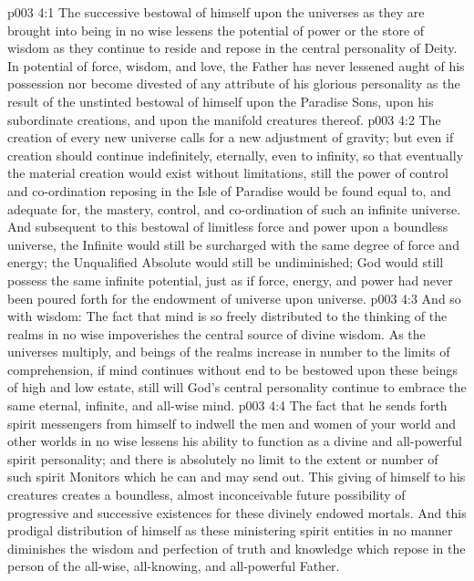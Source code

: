 \vs p003 4:1 The successive bestowal of himself upon the universes as they are brought into being in no wise lessens the potential of power or the store of wisdom as they continue to reside and repose in the central personality of Deity. In potential of force, wisdom, and love, the Father has never lessened aught of his possession nor become divested of any attribute of his glorious personality as the result of the unstinted bestowal of himself upon the Paradise Sons, upon his subordinate creations, and upon the manifold creatures thereof.
\vs p003 4:2 The creation of every new universe calls for a new adjustment of gravity; but even if creation should continue indefinitely, eternally, even to infinity, so that eventually the material creation would exist without limitations, still the power of control and co\hyp{}ordination reposing in the Isle of Paradise would be found equal to, and adequate for, the mastery, control, and co\hyp{}ordination of such an infinite universe. And subsequent to this bestowal of limitless force and power upon a boundless universe, the Infinite would still be surcharged with the same degree of force and energy; the Unqualified Absolute would still be undiminished; God would still possess the same infinite potential, just as if force, energy, and power had never been poured forth for the endowment of universe upon universe.
\vs p003 4:3 And so with wisdom: The fact that mind is so freely distributed to the thinking of the realms in no wise impoverishes the central source of divine wisdom. As the universes multiply, and beings of the realms increase in number to the limits of comprehension, if mind continues without end to be bestowed upon these beings of high and low estate, still will God’s central personality continue to embrace the same eternal, infinite, and all\hyp{}wise mind.
\vs p003 4:4 The fact that he sends forth spirit messengers from himself to indwell the men and women of your world and other worlds in no wise lessens his ability to function as a divine and all\hyp{}powerful spirit personality; and there is absolutely no limit to the extent or number of such spirit Monitors which he can and may send out. This giving of himself to his creatures creates a boundless, almost inconceivable future possibility of progressive and successive existences for these divinely endowed mortals. And this prodigal distribution of himself as these ministering spirit entities in no manner diminishes the wisdom and perfection of truth and knowledge which repose in the person of the all\hyp{}wise, all\hyp{}knowing, and all\hyp{}powerful Father.
